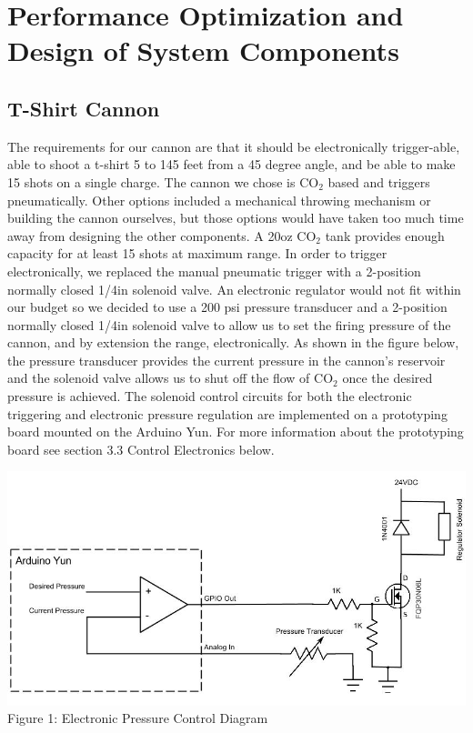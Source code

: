 \documentclass[letterpaper,12pt]{article}
\begin{document}
\section{Performance Optimization and Design of System Components}
\label{sec:optimization}

\subsection{T-Shirt Cannon}
The requirements for our cannon are that it should be electronically
trigger-able, able to shoot a t-shirt 5 to 145 feet from a 45 degree angle,
and be able to make 15 shots on a single charge. The cannon we chose is CO$_2$
based and triggers pneumatically. Other options included a mechanical throwing
mechanism or building the cannon ourselves, but those options would have taken
too much time away from designing the other components. A 20oz CO$_2$ tank
provides enough capacity for at least 15 shots at maximum range. In order to
trigger electronically, we replaced the manual pneumatic trigger with
a 2-position normally closed 1/4in solenoid valve. An electronic regulator would not fit within our budget so we
decided to use a 200 psi pressure transducer and a 2-position normally closed 1/4in solenoid valve to allow us to set
the firing pressure of the cannon, and by extension the range, electronically. As shown in the figure below, the
pressure transducer provides the current pressure in the cannon's reservoir and
the solenoid valve allows us to shut off the flow of CO$_2$ once the desired pressure
is achieved. The solenoid control circuits for both the electronic triggering and electronic pressure regulation are implemented on a prototyping board mounted on the Arduino Yun. For more information about the prototyping board see section 3.3 Control Electronics below.\\

\begin{center}
    \includegraphics[width=15cm]{./pics/cannon/PressureControl.jpg}\\
     Figure 1: Electronic Pressure Control Diagram
\end{center}
\end{document}
